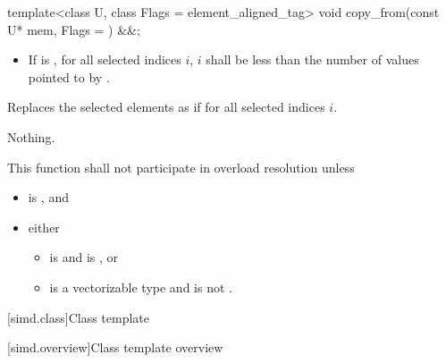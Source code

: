 \begin{itemdecl}
template<class U, class Flags = element_aligned_tag> void copy_from(const U* mem, Flags = {}) &&;
\end{itemdecl}

\begin{itemdescr}
  \pnum\requires
  \begin{itemize}
    \item If  is , for all selected indices $i$, $i$ shall be less than the number of values pointed to by .
  \end{itemize}

  \pnum\effects
  Replaces the selected elements as if  for all selected indices $i$.

  \pnum\throws Nothing.

  \pnum\remarks
  This function shall not participate in overload resolution unless
  \begin{itemize}
    \item {} is , and
    \item either
      \begin{itemize}
        \item {} is  and  is , or
        \item {} is a vectorizable type and  is not .
      \end{itemize}
  \end{itemize}
\end{itemdescr}

[simd.class]{Class template }

[simd.overview]{Class template  overview}

